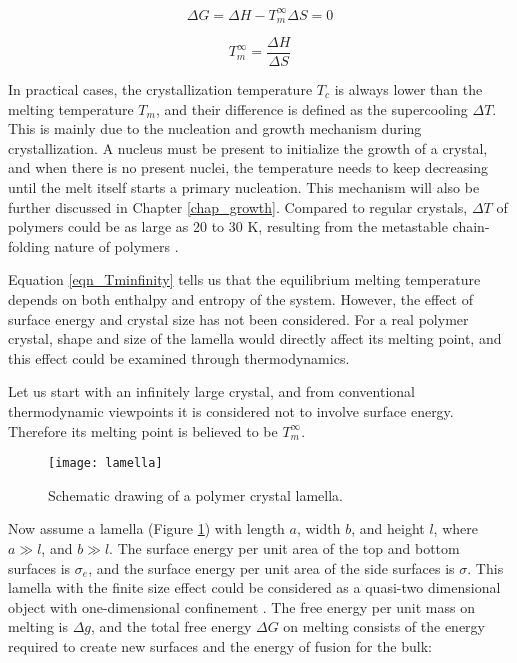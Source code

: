 \begin{equation}
\label{eqn_deltaG}
\Delta G = \Delta H - T_{m}^{\infty} \Delta S = 0
\end{equation}

\begin{equation}
\label{eqn_Tminfinity}
T_{m}^{\infty} = \dfrac{\Delta H}{\Delta S}
\end{equation}

In practical cases, the crystallization temperature $T_{c}$ is always lower than the melting temperature $T_{m}$, and their difference is defined as the supercooling $\Delta T$. This is mainly due to the nucleation and growth mechanism during crystallization. A nucleus must be present to initialize the growth of a crystal, and when there is no present nuclei, the temperature needs to keep decreasing until the melt itself starts a primary nucleation. This mechanism will also be further discussed in Chapter \ref{chap_growth}. Compared to regular crystals, $\Delta T$ of polymers could be as large as 20 to 30 K, resulting from the metastable chain-folding nature of polymers \cite{Hu2013}.

Equation \ref{eqn_Tminfinity} tells us that the equilibrium melting temperature depends on both enthalpy and entropy of the system. However, the effect of surface energy and crystal size has not been considered. For a real polymer crystal, shape and size of the lamella would directly affect its melting point, and this effect could be examined through thermodynamics.

Let us start with an infinitely large crystal, and from conventional thermodynamic viewpoints it is considered not to involve surface energy. Therefore its melting point is believed to be $T_{m}^{\infty}$.

\begin{figure}[H]
	\center
	\vspace{1 cm}
	\texttt{[image: lamella]}
	\caption{Schematic drawing of a polymer crystal lamella.}
	\label{fig:lamella}
\end{figure}

Now assume a lamella (Figure \ref{fig:lamella}) with length $a$, width $b$, and height $l$, where $a \gg l$, and $b \gg l$. The surface energy per unit area of the top and bottom surfaces is $\sigma_{e}$, and the surface energy per unit area of the side surfaces is $\sigma$. This lamella with the finite size effect could be considered as a quasi-two dimensional object with one-dimensional confinement \cite{Zhang2016}. The free energy per unit mass on melting is $\Delta g$, and the total free energy $\Delta G$ on melting consists of the energy required to create new surfaces and the energy of fusion for the bulk:

